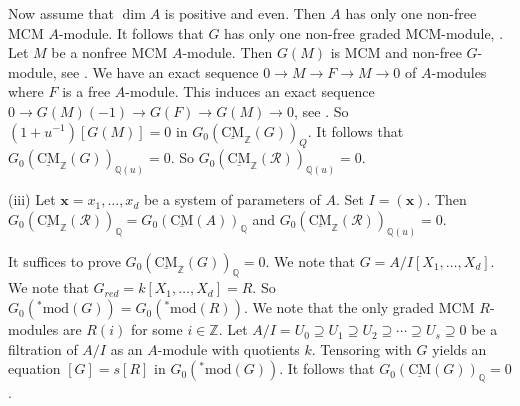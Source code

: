 \documentclass{amsart}
\newcommand{\bx}{\mathbf{x} }
\newcommand{\Z}{\mathbb{Z} }
\newcommand{\Q}{\mathbb{Q} }
\newcommand{\eR}{\mathcal{R} }
\newcommand{\rt}{\rightarrow}
\newcommand{\CMS}{\operatorname{\underline{CM}}}
\newcommand{\smod}{\operatorname{^*mod}}
\theoremstyle{plain}
\theoremstyle{definition}
\theoremstyle{remark}
\begin{document}
{Now assume that $\dim A$ is positive and even. Then $A$ has only one non-free MCM $A$-module. It follows that $G$ has only one non-free graded MCM-module, \cite[15.2]{Y}. Let $M$ be a nonfree MCM $A$-module. Then $G(M)$ is MCM and non-free $G$-module, see \cite[Theorem 16]{P-1}. We have an exact sequence $0 \rt M \rt F \rt M \rt 0$ of $A$-modules where $F$ is a free $A$-module.
This induces an exact sequence $0 \rt G(M)(-1) \rt G(F) \rt G(M) \rt 0$, see \cite[14.3, 14.4]{Y}. So $(1 + u^{-1})[G(M)] = 0$ in $G_0(\CMS_\Z(G))_Q$. It follows that $G_0(\CMS_\Z(G))_{\Q(u)} = 0$. So $G_0(\CMS_\Z(\eR))_{\Q(u)} = 0$.

(iii) Let $\bx = x_1,\ldots,x_d$ be a system of parameters of $A$. Set $I = (\bx)$. Then $G_0(\CMS_\Z(\eR))_\Q = G_0(\CMS(A))_\Q$ and $G_0(\CMS_\Z(\eR))_{\Q(u)} = 0.$

It suffices to prove $G_0(\CMS_\Z(G))_\Q = 0$. We note that $G = A/I[X_1, \ldots, X_d]$. We note that $G_{red} = k[X_1, \ldots, X_d] = R$. So $G_0(\smod(G)) = G_0(\smod(R))$. We note that the only graded MCM $R$-modules are $R(i)$ for some $i \in \Z$. Let $A/I = U_0 \supseteq U_1 \supseteq U_2 \supseteq \cdots \supseteq U_s  \supseteq 0$ be a filtration of $A/I$ as an $A$-module with quotients $k$. Tensoring with $G$ yields an equation $[G] = s[R]$ in $G_0(\smod(G))$. It follows that $G_0(\CMS(G))_\Q = 0$.
}
\end{document}
